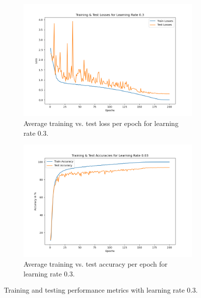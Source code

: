 \begin{figure}[H]
    \centering
    \begin{subfigure}[t]{0.48\textwidth}
        \centering
        \includegraphics[width=\textwidth]{images/ex_2_losses_03}
        \caption{Average training vs. test loss per epoch for learning rate 0.3.}
    \end{subfigure}
    \hfill
    \begin{subfigure}[t]{0.48\textwidth}
        \centering
        \includegraphics[width=\textwidth]{images/ex_2_accuracies_003}
        \caption{Average training vs. test accuracy per epoch for learning rate 0.3.}
    \end{subfigure}
    \caption{Training and testing performance metrics with learning rate 0.3.}
\end{figure}

